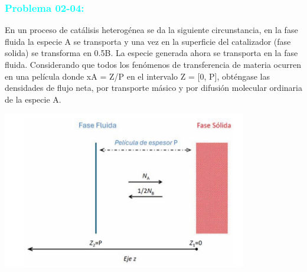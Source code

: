 \documentclass{report}
\begin{document}
\subsubsection{\textbf{\textcolor{cyan}{Problema 02-04:}}}
\begin{raggedright}
	En un proceso de catálisis heterogénea se da la siguiente circunstancia, en la fase fluida la especie A se transporta
	y una vez en la superficie del catalizador (fase solida)  se transforma en 0.5B. La especie generada ahora se transporta
	en la fase fluida. Considerando que todos los fenómenos de transferencia de materia ocurren en una película donde xA = Z/P
	en el intervalo Z = [0, P], obténgase las densidades de flujo neta, por transporte másico y por difusión molecular ordinaria de la especie A.
\end{raggedright}
\begin{center}
	\includegraphics[width=0.8\textwidth]{02_04.png}\\
\end{center}
\end{document}
